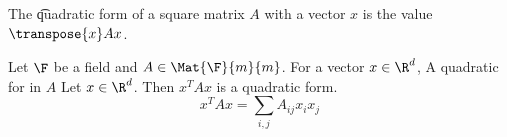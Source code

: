 


The \t{quadratic form} of a square matrix $A$ with a vector $x$ is the value $\transpose{x}Ax$.


Let $\F$ be a field and $A \in \Mat{\F}{m}{m}$.
For a vector $x \in \R^d$, A quadratic for in $A$
Let $x \in \R^d$.
Then $x^T A x$ is a quadratic form.
\[
  x^T A x = \sum_{i,j} A_{ij}x_{i}x_{j}
\]

\blankpage
